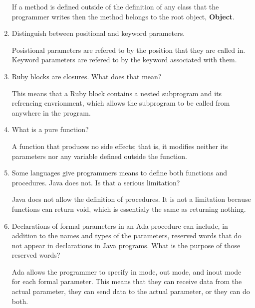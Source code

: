 \begin{enumerate}
  \begin{answer}
    If a method is defined outside of the definition of any class that the programmer writes then the method belongs to the root object, \textbf{Object}.
  \end{answer}

  \item Distinguish between positional and keyword parameters.

  \begin{answer}
  Posistional parameters are refered to by the position that they are called in.  Keyword parameters are refered to by the keyword associated with them.  
  \end{answer}

  \item Ruby blocks are closures. What does that mean?

  \begin{answer}
    This means that a Ruby block contains a nested subprogram and its refrencing envrionment, which allows the subprogram to be called from anywhere in the program.
  \end{answer}

  \item What is a pure function?

  \begin{answer}
    A function that produces no side effects; that is, it modifies neither its parameters nor any variable defined outside the function.
  \end{answer}

  \item Some languages give programmers means to define
    both functions and procedures. Java does not. Is that
    a serious limitation?

  \begin{answer}
    Java does not allow the definition of procedures.  It is not a limitation because functions can return void, which is essentialy the same as returning nothing.
  \end{answer}

  \item Declarations of formal parameters in an Ada procedure
    can include, in addition to the names and types of the
    parameters, reserved words that do not appear in declarations
    in Java programs. 
    What is the purpose of those reserved words?

    \begin{answer}
    Ada allows the programmer to specify in mode, out mode, and inout mode for each formal parameter.  This means that they can receive data from the actual parameter, they can send data to the actual parameter, or they can do both.
    \end{answer}
 

\end{enumerate}
